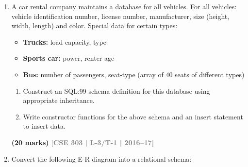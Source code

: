 \documentclass[12pt]{article}
\newcommand{\yr}[1]{\hfill\textcolor{gray}{\small\textbf{[#1]}}}
\newcommand{\mk}[1]{\textcolor{orange!70!black}{\small\textbf{(#1 marks)}}}
\begin{document}
\begin{enumerate}
\item A car rental company maintains a database for all vehicles. For all vehicles: vehicle identification number, license number, manufacturer, size (height, width, length) and color. Special data for certain types:
\begin{itemize}[leftmargin=1.5em,itemsep=1pt]
  \item \textbf{Trucks:} load capacity, type
  \item \textbf{Sports car:} power, renter age
  \item \textbf{Bus:} number of passengers, seat-type (array of 40 seats of different types)
\end{itemize}
\begin{enumerate}
  \item Construct an SQL:99 schema definition for this database using appropriate inheritance.
  \item Write constructor functions for the above schema and an insert statement to insert data.
\end{enumerate}
\mk{20} \yr{CSE 303 | L-3/T-1 | 2016--17}


\item Convert the following E-R diagram into a relational schema:

\medskip
\begin{center}
\end{center}
\end{enumerate}
\end{document}
